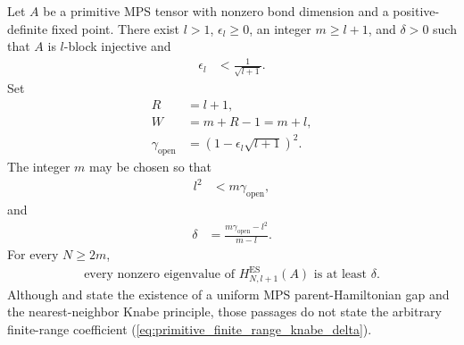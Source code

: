 \begin{theorem}
    \label{thm:primitive_parent_hamiltonian_finite_range_knabe_gap}
    \leanok
    Let $A$ be a primitive MPS tensor with nonzero bond dimension and a
    positive-definite fixed point.  There exist $l>1$, $\epsilon_l\geq0$, an
    integer $m\geq l+1$, and $\delta>0$ such that $A$ is $l$-block injective
    and
    \begin{align}
        \epsilon_l
         & <\frac{1}{\sqrt{l+1}}.
        \label{eq:primitive_finite_range_knabe_threshold}
    \end{align}
    Set
    \begin{align}
        R & =l+1,                                   \\
        W & =m+R-1=m+l,                             \\
        \gamma_{\mathrm{open}}
          & =\left(1-\epsilon_l\sqrt{l+1}\right)^2.
        \label{eq:primitive_finite_range_knabe_parameters}
    \end{align}
    The integer $m$ may be chosen so that
    \begin{align}
        l^2 & <m\gamma_{\mathrm{open}},
        \label{eq:primitive_finite_range_knabe_numerator}
    \end{align}
    and
    \begin{align}
        \delta
         & =\frac{m\gamma_{\mathrm{open}}-l^2}{m-l}.
        \label{eq:primitive_finite_range_knabe_delta}
    \end{align}
    For every $N\geq2m$,
    \begin{align}
        \text{every nonzero eigenvalue of }H_{N,l+1}^{\mathrm{ES}}(A)
        \text{ is at least }\delta.
        \label{eq:primitive_finite_range_knabe_gap}
    \end{align}
    Although \cite[lines~1460--1500]{PerezGarcia2007Matrix} and
    \cite[lines~2184--2188,2194--2197]{Cirac2021Matrix} state the existence of
    a uniform MPS parent-Hamiltonian gap and the nearest-neighbor Knabe
    principle, those passages do not state the arbitrary finite-range
    coefficient (\ref{eq:primitive_finite_range_knabe_delta}).
\end{theorem}

